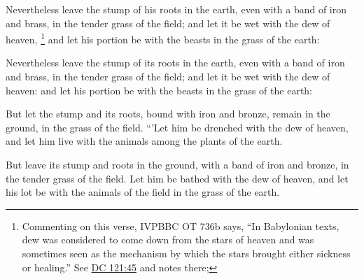 			Nevertheless leave the stump of his roots in the earth, even with a band of iron and brass, in the tender grass of the field; and let it be wet with the dew of heaven,%
				\footnote{%
					Commenting on this verse, IVPBBC OT 736b says, ``In Babylonian texts, dew was considered to come down from the stars of heaven and was sometimes seen as the mechanism by which the stars brought either sickness or healing.'' See \hyperref[DC121-45]{DC 121:45} and notes there;
					}
			and let his portion be with the beasts in the grass of the earth:

			\begin{versebox}
					\item[BHS] 
					\item[LXX] 
					\item[ASV] Nevertheless leave the stump of its roots in the earth, even with a band of iron and brass, in the tender grass of the field; and let it be wet with the dew of heaven: and let his portion be with the beasts in the grass of the earth:
					\item[NIV] But let the stump and its roots, bound with iron and bronze, remain in the ground, in the grass of the field. “’Let him be drenched with the dew of heaven, and let him live with the animals among the plants of the earth.
					\item[NRSV] But leave its stump and roots in the ground, with a band of iron and bronze, in the tender grass of the field. Let him be bathed with the dew of heaven, and let his lot be with the animals of the field in the grass of the earth.
			\end{versebox}

